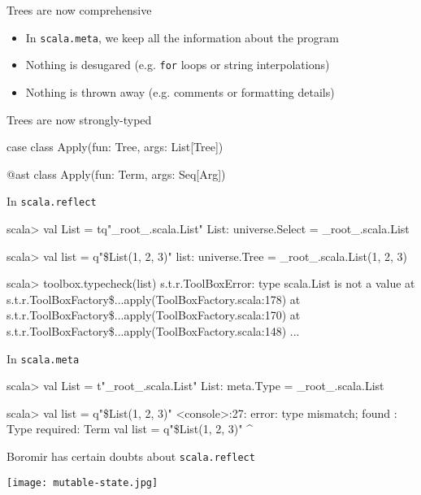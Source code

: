 \documentclass[svgnames,dvipsnames,hyperref={bookmarks=false},usepdftitle=false]{beamer}
\begin{document}
\begin{frame}{Trees are now comprehensive}
\begin{itemize}
\item In \texttt{scala.meta}, we keep all the information about the program
\item Nothing is desugared (e.g. \texttt{for} loops or string interpolations)
\item Nothing is thrown away (e.g. comments or formatting details)
\end{itemize}

\end{frame}
\begin{frame}[fragile]{Trees are now strongly-typed}
\begin{beforeblock}
case class Apply(fun: Tree, args: List[Tree])
\end{beforeblock}
\begin{afterblock}
@ast class Apply(fun: Term, args: Seq[Arg])
\end{afterblock}
\end{frame}

\begin{frame}[fragile]{In \texttt{scala.reflect}}
\begin{semiverbatim}
scala> val List = tq"_root_.scala.List"
List: universe.Select = _root_.scala.List

scala> val list = q"\$List(1, 2, 3)"
list: universe.Tree = _root_.scala.List(1, 2, 3)

scala> toolbox.typecheck(list)
s.t.r.ToolBoxError: type scala.List is not a value
  at s.t.r.ToolBoxFactory\$...apply(ToolBoxFactory.scala:178)
  at s.t.r.ToolBoxFactory\$...apply(ToolBoxFactory.scala:170)
  at s.t.r.ToolBoxFactory\$...apply(ToolBoxFactory.scala:148)
  ...
\end{semiverbatim}
\end{frame}

\begin{frame}[fragile]{In \texttt{scala.meta}}
\begin{semiverbatim}
scala> val List = t"_root_.scala.List"
List: meta.Type = _root_.scala.List

scala> val list = q"\$List(1, 2, 3)"
<console>:27: error: type mismatch;
 found   : Type
 required: Term
              val list = q"\$List(1, 2, 3)"
                            ^
\end{semiverbatim}
\end{frame}

\begin{frame}[c, fragile]{Boromir has certain doubts about \texttt{scala.reflect}}
\begin{center}
\texttt{[image: mutable-state.jpg]}
\end{center}
\end{frame}
\end{document}

